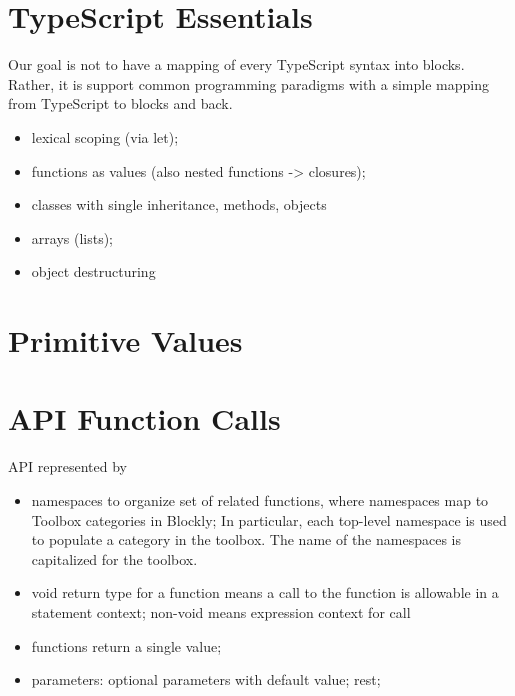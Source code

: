 \documentclass[sigplan,10pt]{acmart}
\begin{document}



\section{TypeScript Essentials}

Our goal is not to have a mapping of every TypeScript syntax into blocks.
Rather, it is support common programming paradigms with a simple mapping
from TypeScript to blocks and back.

\begin{itemize}
  \item lexical scoping (via let);
  \item functions as values (also nested functions -> closures);
  \item classes with single inheritance, methods, objects
  \item arrays (lists);
  \item object destructuring
\end{itemize}

\section{Primitive Values}



\section{API Function Calls}

API represented by
\begin{itemize}
  \item namespaces to organize set of related functions, 
       where namespaces map to Toolbox categories in Blockly;
       In particular, each top-level namespace is used to populate a category 
       in the toolbox. The name of the namespaces is capitalized for the toolbox. 

  \item void return type for a function means a call to the function is allowable in
      a statement context; non-void means expression context for call
  \item functions return a single value;
  \item parameters: optional parameters with default value; rest; 
\end{itemize}
\end{document}
